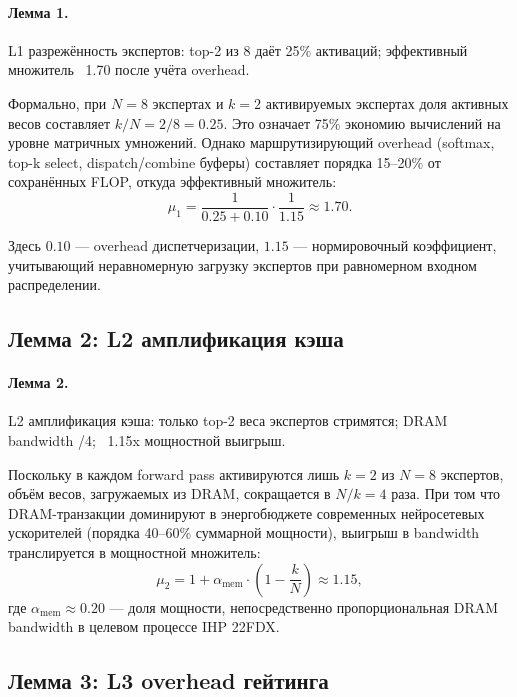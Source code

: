 \paragraph{Лемма 1.} L1 разрежённость экспертов: top-2 из 8 даёт 25\% активаций; эффективный множитель ~1.70 после учёта overhead.

Формально, при $N=8$ экспертах и $k=2$ активируемых экспертах доля активных весов составляет $k/N = 2/8 = 0{.}25$. Это означает 75\% экономию вычислений на уровне матричных умножений. Однако маршрутизирующий overhead (softmax, top-k select, dispatch/combine буферы) составляет порядка 15--20\% от сохранённых FLOP, откуда эффективный множитель:
\begin{equation}
  \mu_1 = \frac{1}{0{.}25 + 0{.}10} \cdot \frac{1}{1{.}15} \approx 1{.}70.
\end{equation}

Здесь $0{.}10$ — overhead диспетчеризации, $1{.}15$ — нормировочный коэффициент, учитывающий неравномерную загрузку экспертов при равномерном входном распределении.

\subsection{Лемма 2: L2 амплификация кэша}

\paragraph{Лемма 2.} L2 амплификация кэша: только top-2 веса экспертов стримятся; DRAM bandwidth /4; ~1.15x мощностной выигрыш.

Поскольку в каждом forward pass активируются лишь $k=2$ из $N=8$ экспертов, объём весов, загружаемых из DRAM, сокращается в $N/k = 4$ раза. При том что DRAM-транзакции доминируют в энергобюджете современных нейросетевых ускорителей (порядка 40--60\% суммарной мощности), выигрыш в bandwidth транслируется в мощностной множитель:
\begin{equation}
  \mu_2 = 1 + \alpha_{\text{mem}} \cdot \left(1 - \frac{k}{N}\right) \approx 1{.}15,
\end{equation}
где $\alpha_{\text{mem}} \approx 0{.}20$ — доля мощности, непосредственно пропорциональная DRAM bandwidth в целевом процессе IHP 22FDX.

\subsection{Лемма 3: L3 overhead гейтинга}

